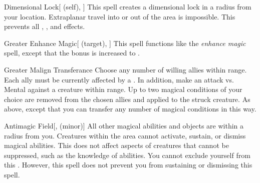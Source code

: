 \lowercase{\hypertarget{spell:Dimensional Lock}{}}\label{spell:Dimensional Lock}
\begin{attuneability}[\nth{4}]{\hypertarget{spell:Dimensional Lock}{Dimensional Lock}}[ (self), ]
This spell creates a dimensional lock in a \arealarge radius  from your location.
Extraplanar travel into or out of the area is impossible.
This prevents all , , and  effects.
\end{attuneability}
\vspace{0.25em}



\lowercase{\hypertarget{spell:Greater Enhance Magic}{}}\label{spell:Greater Enhance Magic}
\begin{attuneability}[\nth{5}]{\hypertarget{spell:Greater Enhance Magic}{Greater Enhance Magic}}[ (target), ]
This spell functions like the \textit{enhance magic} spell, except that the bonus is increased to .
\end{attuneability}
\vspace{0.25em}



\lowercase{\hypertarget{spell:Greater Malign Transferance}{}}\label{spell:Greater Malign Transferance}
\begin{freeability}[\nth{5}]{\hypertarget{spell:Greater Malign Transferance}{Greater Malign Transferance}}
Choose any number of willing allies within \rngmed range.
Each ally must be currently affected by a  .
In addition, make an attack vs. Mental against a creature within \rngmed range.
\hit Up to two magical conditions of your choice are removed from the chosen allies and applied to the struck creature.
\crit As above, except that you can transfer any number of magical conditions in this way.
\end{freeability}
\vspace{0.25em}



\lowercase{\hypertarget{spell:Antimagic Field}{}}\label{spell:Antimagic Field}
\begin{freeability}[\nth{7}]{\hypertarget{spell:Antimagic Field}{Antimagic Field}}[,  (minor)]
All other magical abilities and objects are  within a \areamed radius  from you.
Creatures within the area cannot activate, sustain, or dismiss magical abilities.
This does not affect aspects of creatures that cannot be suppressed, such as the knowledge of abilities.
You cannot exclude yourself from this .
However, this spell does not prevent you from sustaining or dismissing this spell.
\end{freeability}
\vspace{0.25em}


